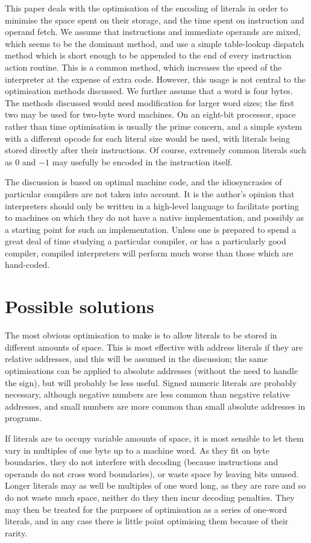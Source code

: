 \documentclass{article}
\begin{document}
This paper deals with the optimisation of the encoding of literals in order to
minimise the space spent on their storage, and the time spent on instruction and
operand fetch. We assume that instructions and immediate operands are mixed, which
seems to be the dominant method, and use a simple table-lookup dispatch method
which is short enough to be appended to the end of every instruction action routine.
This is a common method, which increases the speed of the interpreter at the expense
of extra code. However, this usage is not central to the optimisation methods
discussed. We further assume that a word is four bytes. The methods discussed
would need modification for larger word sizes; the first two may be used for two-byte
word machines. On an eight-bit processor, space rather than time optimisation
is usually the prime concern, and a simple system with a different opcode for
each literal size would be used, with literals being stored directly after their
instructions. Of course, extremely common literals such as 0 and \( -1 \) may
usefully be encoded in the instruction itself.

The discussion is based on optimal machine code, and the idiosyncrasies of particular
compilers are not taken into account. It is the author's opinion that interpreters
should only be written in a high-level language to facilitate porting to machines
on which they do not have a native implementation, and possibly as a starting
point for such an implementation. Unless one is prepared to spend a great deal
of time studying a particular compiler, or has a particularly good compiler, compiled
interpreters will perform much worse than those which are hand-coded.


\section{Possible solutions }

The most obvious optimisation to make is to allow literals to be stored in different
amounts of space. This is most effective with address literals if they are relative
addresses, and this will be assumed in the discussion; the same optimisations
can be applied to absolute addresses (without the need to handle the sign), but
will probably be less useful. Signed numeric literals are probably necessary,
although negative numbers are less common than negative relative addresses, and
small numbers are more common than small absolute addresses in programs.

If literals are to occupy variable amounts of space, it is most sensible to let
them vary in multiples of one byte up to a machine word. As they fit on byte boundaries,
they do not interfere with decoding (because instructions and operands do not
cross word boundaries), or waste space by leaving bits unused. Longer literals
may as well be multiples of one word long, as they are rare and so do not waste
much space, neither do they then incur decoding penalties. They may then be treated
for the purposes of optimisation as a series of one-word literals, and in any
case there is little point optimising them because of their rarity.
\end{document}
